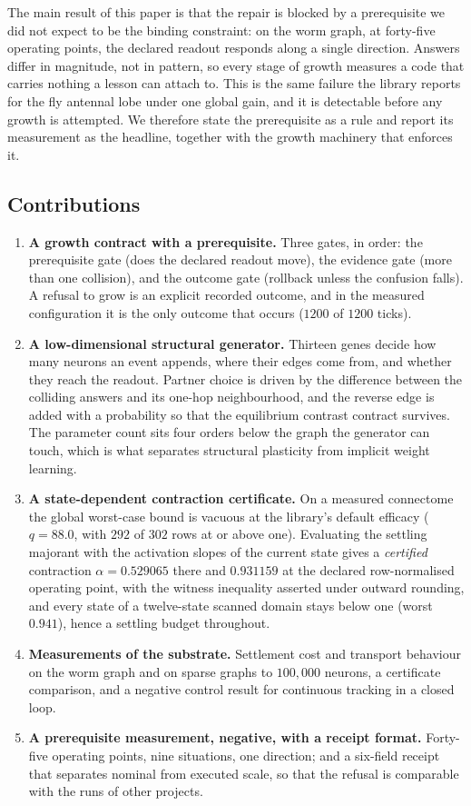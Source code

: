 \documentclass[11pt]{article}
\theoremstyle{remark}
\begin{document}
The main result of this paper is that the repair is blocked by a prerequisite we did not expect to
be the binding constraint: on the worm graph, at forty-five operating points, the declared readout
responds along a single direction. Answers differ in magnitude, not in pattern, so every stage of
growth measures a code that carries nothing a lesson can attach to. This is the same failure the
library reports for the fly antennal lobe under one global gain, and it is detectable before any
growth is attempted. We therefore state the prerequisite as a rule and report its measurement as
the headline, together with the growth machinery that enforces it.

\subsection{Contributions}

\begin{enumerate}
\item \textbf{A growth contract with a prerequisite.} Three gates, in order: the prerequisite gate
(does the declared readout move), the evidence gate (more than one collision), and the outcome
gate (rollback unless the confusion falls). A refusal to grow is an explicit recorded outcome, and
in the measured configuration it is the only outcome that occurs ($1200$ of $1200$ ticks).
\item \textbf{A low-dimensional structural generator.} Thirteen genes decide how many neurons an
event appends, where their edges come from, and whether they reach the readout. Partner choice is
driven by the difference between the colliding answers and its one-hop neighbourhood, and the
reverse edge is added with a probability so that the equilibrium contrast contract survives. The
parameter count sits four orders below the graph the generator can touch, which is what separates
structural plasticity from implicit weight learning.
\item \textbf{A state-dependent contraction certificate.} On a measured connectome the global
worst-case bound is vacuous at the library's default efficacy ($q = 88.0$, with $292$ of $302$ rows at
or above one). Evaluating the settling majorant with the activation slopes of the current state gives a
\emph{certified} contraction $\alpha = 0.529065$ there and $0.931159$ at the declared row-normalised
operating point, with the witness inequality asserted under outward rounding, and every state of a
twelve-state scanned domain stays below one (worst $0.941$), hence a settling budget throughout.
\item \textbf{Measurements of the substrate.} Settlement cost and transport behaviour on the worm
graph and on sparse graphs to $100{,}000$ neurons, a certificate comparison, and a negative
control result for continuous tracking in a closed loop.
\item \textbf{A prerequisite measurement, negative, with a receipt format.} Forty-five operating
points, nine situations, one direction; and a six-field receipt that separates nominal from
executed scale, so that the refusal is comparable with the runs of other projects.
\end{enumerate}
\end{document}

